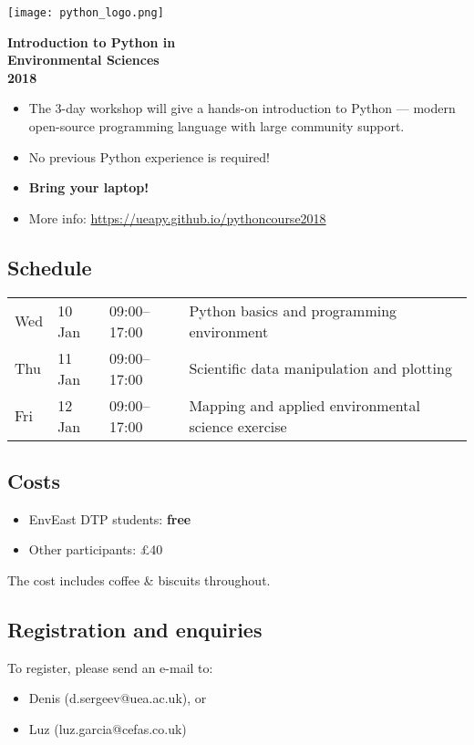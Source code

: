 \documentclass[paper=a4]{scrartcl}
\newcommand*{\pyitem}{\item [{\texttt{[image: python\_logo.png]}}]}
\begin{document}
\pagestyle{empty} %

\begin{center}
\begin{minipage}{0.2\linewidth}
    \texttt{[image: python\_logo.png]}
    \vspace{0.5cm}
\end{minipage}

\Huge \textbf{Introduction to Python in \\ Environmental Sciences \\ 2018}

\end{center}

\begin{itemize}
\pyitem The 3-day workshop will give a hands-on introduction to Python --- modern open-source programming language with large community support.
\pyitem No previous Python experience is required!
\pyitem \textbf{Bring your laptop!}
\pyitem More info: \url{https://ueapy.github.io/pythoncourse2018}
\end{itemize}


\subsection*{Schedule}
\begin{center}
\begin{tabular}{llll}
Wed & 10 Jan & 09:00--17:00 & Python basics and programming environment\\
Thu & 11 Jan & 09:00--17:00 & Scientific data manipulation and plotting \\
Fri & 12 Jan & 09:00--17:00 & Mapping and applied environmental science exercise\\
\end{tabular}
\end{center}


\subsection*{Costs}
\begin{itemize}
\pyitem EnvEast DTP students: \textbf{free}
\pyitem Other participants: \pounds 40
\end{itemize}
\vspace{-0.5cm}
\scriptsize The cost includes coffee \& biscuits throughout. \normalsize

\subsection*{Registration and enquiries}
To register, please send an e-mail to:
\begin{itemize}
\pyitem Denis (d.sergeev@uea.ac.uk), or
\pyitem Luz (luz.garcia@cefas.co.uk)
\end{itemize}
\end{document}
